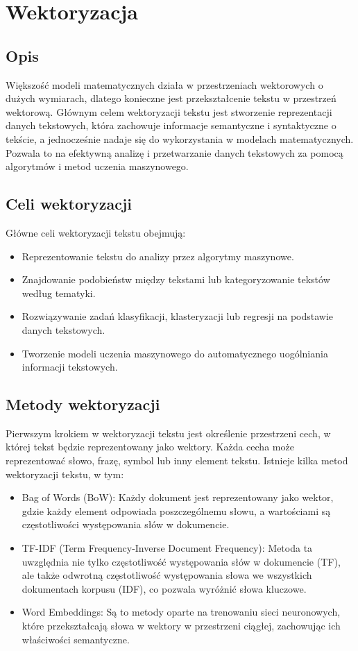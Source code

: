 \section{Wektoryzacja}

	\subsection{Opis}
		Większość modeli matematycznych działa w przestrzeniach wektorowych o dużych wymiarach, dlatego konieczne jest przekształcenie tekstu w przestrzeń wektorową. Głównym celem wektoryzacji tekstu jest stworzenie reprezentacji danych tekstowych, która zachowuje informacje semantyczne i syntaktyczne o tekście, a jednocześnie nadaje się do wykorzystania w modelach matematycznych. Pozwala to na efektywną analizę i przetwarzanie danych tekstowych za pomocą algorytmów i metod uczenia maszynowego. \cite{Vectorization}

	\subsection{Celi wektoryzacji}
		Główne celi wektoryzacji tekstu obejmują:
		\begin{itemize}
			\item Reprezentowanie tekstu do analizy przez algorytmy maszynowe.
			\item Znajdowanie podobieństw między tekstami lub kategoryzowanie tekstów według tematyki.
			\item Rozwiązywanie zadań klasyfikacji, klasteryzacji lub regresji na podstawie danych tekstowych.
			\item Tworzenie modeli uczenia maszynowego do automatycznego uogólniania informacji tekstowych.
		\end{itemize}

	\subsection{Metody wektoryzacji}
		Pierwszym krokiem w wektoryzacji tekstu jest określenie przestrzeni cech, w której tekst będzie reprezentowany jako wektory. Każda cecha może reprezentować słowo, frazę, symbol lub inny element tekstu.
		Istnieje kilka metod wektoryzacji tekstu, w tym:
		\begin{itemize}
			\item Bag of Words (BoW): Każdy dokument jest reprezentowany jako wektor, gdzie każdy element odpowiada poszczególnemu słowu, a wartościami są częstotliwości występowania słów w dokumencie.
			\item TF-IDF (Term Frequency-Inverse Document Frequency): Metoda ta uwzględnia nie tylko częstotliwość występowania słów w dokumencie (TF), ale także odwrotną częstotliwość występowania słowa we wszystkich dokumentach korpusu (IDF), co pozwala wyróżnić słowa kluczowe.
			\item Word Embeddings: Są to metody oparte na trenowaniu sieci neuronowych, które przekształcają słowa w wektory w przestrzeni ciągłej, zachowując ich właściwości semantyczne.\
		\end{itemize}

